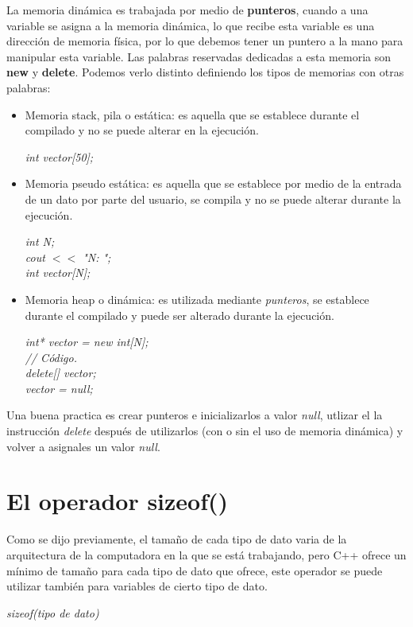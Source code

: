 La memoria dinámica es trabajada por medio de \textbf{punteros}, cuando a una variable se asigna a la memoria dinámica, lo que recibe esta variable es una dirección de memoria física, por lo que debemos tener un puntero a la mano para manipular esta variable. Las palabras reservadas dedicadas a esta memoria son \textbf{new} y \textbf{delete}. Podemos verlo distinto definiendo los tipos de memorias con otras palabras:
\begin{itemize}
    \item Memoria stack, pila o estática: es aquella que se establece durante el compilado y no se puede alterar en la ejecución.
    \begin{center}
        \textit{int vector[50];}
    \end{center}
    \item Memoria pseudo estática: es aquella que se establece por medio de la entrada de un dato por parte del usuario, se compila y no se puede alterar durante la ejecución.
    \begin{center}
        \textit{
            int N; \\
            cout $<<$ "N: "; \\
            int vector[N];
        }
    \end{center}
    \item Memoria heap o dinámica: es utilizada mediante \textit{punteros}, se establece durante el compilado y puede ser alterado durante la ejecución.
    \begin{center}
        \textit{
            int* vector = new int[N]; \\
            // Código. \\
            delete[] vector; \\
            vector = null;
        }
    \end{center}
\end{itemize}

Una buena practica es crear punteros e inicializarlos a valor \textit{null}, utlizar el la instrucción \textit{delete} después de utilizarlos (con o sin el uso de memoria dinámica) y volver a asignales un valor \textit{null}.



\section{El operador sizeof()}
\hspace{0.55cm}Como se dijo previamente, el tamaño de cada tipo de dato varia de la arquitectura de la computadora en la que se está trabajando, pero C++ ofrece un mínimo de tamaño para cada tipo de dato que ofrece, este operador se puede utilizar también para variables de cierto tipo de dato.
\begin{center}
    \textit{sizeof(tipo de dato)}
\end{center}

